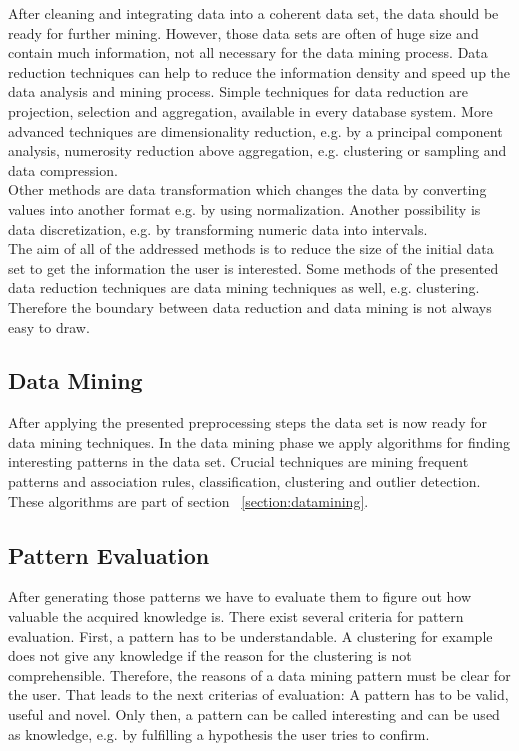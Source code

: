 After cleaning and integrating data into a coherent data set, the data should be ready for further mining. However, those data sets are often of huge size and contain much information, not all necessary for the data mining process. Data reduction techniques can help to reduce the information density and speed up the data analysis and mining process. Simple techniques for data reduction are projection, selection and aggregation, available in every database system. More advanced techniques are dimensionality reduction, e.g. by a principal component analysis, numerosity reduction above aggregation, e.g. clustering or sampling and data compression. 
\\
Other methods are data transformation which changes the data by converting values into another format e.g. by using normalization. Another possibility is data discretization, e.g. by transforming numeric data into intervals. 
\\
The aim of all of the addressed methods is to reduce the size of the initial data set to get the information the user is interested. Some methods of the presented data reduction techniques are data mining techniques as well, e.g. clustering. Therefore the boundary between data reduction and data mining is not always easy to draw.


\subsection{Data Mining}

After applying the presented preprocessing steps the data set is now ready for data mining techniques. In the data mining phase we apply algorithms for finding interesting patterns in the data set. Crucial techniques are mining frequent patterns and association rules, classification, clustering and outlier detection. These algorithms are part of section ~\ref{section:datamining}. 


\subsection{Pattern Evaluation}

After generating those patterns we have to evaluate them to figure out how valuable the acquired knowledge is. There exist several criteria for pattern evaluation. First, a pattern has to be understandable. A clustering for example does not give any knowledge if the reason for the clustering is not comprehensible. Therefore, the reasons of a data mining pattern must be clear for the user. That leads to the next criterias of evaluation: A pattern has to be valid, useful and novel. Only then, a pattern can be called interesting and can be used as knowledge, e.g. by fulfilling a hypothesis the user tries to confirm. 


